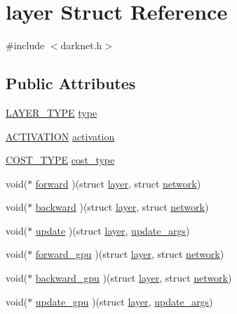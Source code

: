 \hypertarget{structlayer}{}\section{layer Struct Reference}
\label{structlayer}


{\ttfamily \#include $<$darknet.\+h$>$}

\subsection*{Public Attributes}
\begin{DoxyCompactItemize}
\item 
\mbox{\hyperlink{darknet_8h_a5f7e99058765b058df158c099200b154}{L\+A\+Y\+E\+R\+\_\+\+T\+Y\+PE}} \mbox{\hyperlink{structlayer_af00e36adaf6e404a3e5234843c723714}{type}}
\item 
\mbox{\hyperlink{darknet_8h_aea09b678fab8ab931902378cbbd79032}{A\+C\+T\+I\+V\+A\+T\+I\+ON}} \mbox{\hyperlink{structlayer_af7e837568a9975545159025b2fdbf31a}{activation}}
\item 
\mbox{\hyperlink{darknet_8h_a590358b1971d8e902008d6731f40e35c}{C\+O\+S\+T\+\_\+\+T\+Y\+PE}} \mbox{\hyperlink{structlayer_a8f172c29b1ada15656f1f346e7491507}{cost\+\_\+type}}
\item 
void($\ast$ \mbox{\hyperlink{structlayer_ad587958fc9c301a5987df7b3d68a09c1}{forward}} )(struct \mbox{\hyperlink{structlayer}{layer}}, struct \mbox{\hyperlink{structnetwork}{network}})
\item 
void($\ast$ \mbox{\hyperlink{structlayer_a97391cfa71ea05cd917a3919f00e14a6}{backward}} )(struct \mbox{\hyperlink{structlayer}{layer}}, struct \mbox{\hyperlink{structnetwork}{network}})
\item 
void($\ast$ \mbox{\hyperlink{structlayer_aefdbd48c48e52160fd806da7973de6e8}{update}} )(struct \mbox{\hyperlink{structlayer}{layer}}, \mbox{\hyperlink{structupdate__args}{update\+\_\+args}})
\item 
void($\ast$ \mbox{\hyperlink{structlayer_ae96ac4b6c9470848c52dddc95cb14b6a}{forward\+\_\+gpu}} )(struct \mbox{\hyperlink{structlayer}{layer}}, struct \mbox{\hyperlink{structnetwork}{network}})
\item 
void($\ast$ \mbox{\hyperlink{structlayer_aedf9ba6db46b7291b41f424ff6346784}{backward\+\_\+gpu}} )(struct \mbox{\hyperlink{structlayer}{layer}}, struct \mbox{\hyperlink{structnetwork}{network}})
\item 
void($\ast$ \mbox{\hyperlink{structlayer_a820d8c7a9764dae29abe87e12f89b19e}{update\+\_\+gpu}} )(struct \mbox{\hyperlink{structlayer}{layer}}, \mbox{\hyperlink{structupdate__args}{update\+\_\+args}})

\end{DoxyCompactItemize}
